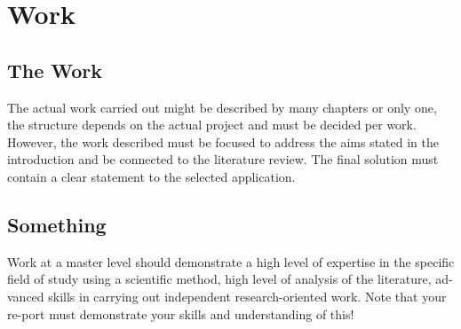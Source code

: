 
\clearpage

\fancyhead{} %

\chapter{Work}\thispagestyle{fancy}

\section{The Work}
The actual work carried out might be described by many chapters or only one, the structure depends on the actual project and must be decided per work. However, the work described must be focused to address the aims stated in the introduction and be connected to the literature review. The final solution must contain a clear statement to the selected application.\\ 

\begin{comment}
To write notes or comments that isn't published in the pdf.
\end{comment}

\section{Something}
Work at a master level should demonstrate a high level of expertise in the specific field of study using a scientific method, high level of analysis of the literature, ad-vanced skills in carrying out independent research-oriented work. Note that your re-port must demonstrate your skills and understanding of this!

\begin{comment}
To write notes or comments that isn't published in the pdf.
\end{comment}
